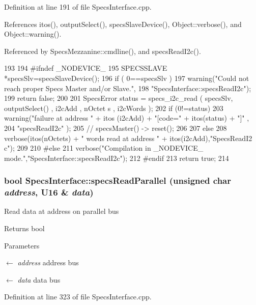 Definition at line 191 of file SpecsInterface.cpp.

References itos(), outputSelect(), specsSlaveDevice(), Object::verbose(), and Object::warning().

Referenced by SpecsMezzanine::cmdline(), and specsReadI2c().


\begin{DoxyCode}
193                                               {
194 #ifndef _NODEVICE_
195   SPECSSLAVE *specsSlv=specsSlaveDevice();
196   if ( 0==specsSlv ){
197     warning("Could not reach proper Specs Master and/or Slave.",
198             "SpecsInterface::specsReadI2c");
199     return false;
200   }
201   SpecsError status = specs_i2c_read ( specsSlv, outputSelect() , i2cAdd , nOctet
      s , i2cWords );
202   if (0!=status){
203     warning("failure at address " + itos (i2cAdd) + "[code=" + itos(status) + "]"
      ,
204             "specsReadI2c" );
205     //    specsMaster() -> reset();
206   }
207   else {
208     verbose(itos(nOctets) + " words read at address " + itos(i2cAdd),"SpecsReadI2
      c");
209   }
210 #else
211   verbose("Compilation in _NODEVICE_ mode.","SpecsInterface::specsReadI2c");
212 #endif
213   return true;
214 }
\end{DoxyCode}
\hypertarget{classSpecsInterface_aefbe6b92a9f9e2f00bf41dd8b2605c05}{
\subsubsection[{specsReadParallel}]{\setlength{\rightskip}{0pt plus 5cm}bool SpecsInterface::specsReadParallel (unsigned char {\em address}, \/  {\bf U16} \& {\em data})}}
\label{classSpecsInterface_aefbe6b92a9f9e2f00bf41dd8b2605c05}
Read data at address on parallel bus

\begin{DoxyReturn}{Returns}
bool 
\end{DoxyReturn}

\begin{DoxyParams}{Parameters}
\item[\mbox{$\leftarrow$} {\em address}]address bus \item[\mbox{$\leftarrow$} {\em data}]data bus \end{DoxyParams}


Definition at line 323 of file SpecsInterface.cpp.


